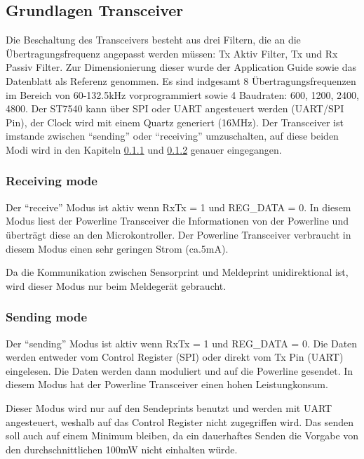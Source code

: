 \subsection{Grundlagen Transceiver}

Die Beschaltung des Transceivers besteht aus drei Filtern, die an die Übertragungsfrequenz angepasst werden müssen: Tx Aktiv Filter, Tx und Rx Passiv Filter. Zur Dimensionierung dieser wurde der Application Guide \cite{Applic_Guide_ST7540} sowie das Datenblatt \cite{Datasheet_ST7540} als Referenz genommen. Es sind indgesamt 8 Übertragungsfrequenzen im Bereich von 60-132.5kHz vorprogrammiert sowie 4 Baudraten: 600, 1200, 2400, 4800. Der ST7540 kann über SPI oder UART angesteuert werden (UART/SPI Pin), der Clock wird mit einem Quartz generiert (16MHz). Der Transceiver ist imstande zwischen ``sending'' oder ``receiving'' umzuschalten, auf diese beiden Modi wird in den Kapiteln \ref{receiveMode} und \ref{sendMode} genauer eingegangen.

\subsubsection{Receiving mode}\label{receiveMode}
Der ``receive'' Modus ist aktiv wenn RxTx = 1 und REG\_DATA = 0. In diesem Modus liest der Powerline Transceiver die Informationen von der Powerline und überträgt diese an den Microkontroller. Der Powerline Transceiver verbraucht in diesem Modus einen sehr geringen Strom (ca.5mA).

Da die Kommunikation zwischen Sensorprint und Meldeprint unidirektional ist, wird dieser Modus nur beim Meldegerät gebraucht.

\subsubsection{Sending mode}\label{sendMode}
Der ``sending'' Modus ist aktiv wenn RxTx = 1 und REG\_DATA = 0. Die Daten werden entweder vom Control Register (SPI) oder direkt vom Tx Pin (UART) eingelesen. Die Daten werden dann moduliert und auf die Powerline gesendet. In diesem Modus hat der Powerline Transceiver einen hohen Leistungkonsum.

Dieser Modus wird nur auf den Sendeprints benutzt und werden mit UART angesteuert, weshalb auf das Control Register nicht zugegriffen wird. Das senden soll auch auf einem Minimum bleiben, da ein dauerhaftes Senden die Vorgabe von den durchschnittlichen 100mW nicht einhalten würde.




